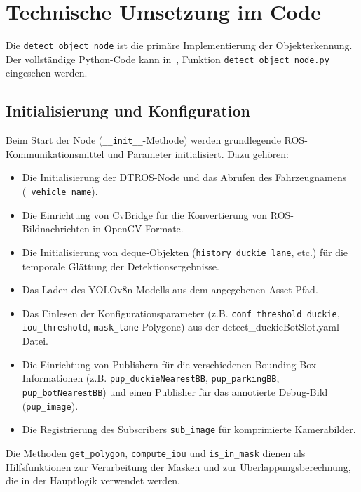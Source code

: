 \section{Technische Umsetzung im Code}
\label{sec:object_detection_code}

Die \texttt{detect\_object\_node} ist die primäre Implementierung der Objekterkennung. Der vollständige Python-Code kann in~\cite{QuackSquad}, Funktion \texttt{detect\_object\_node.py} eingesehen werden.

\subsection{Initialisierung und Konfiguration}
Beim Start der Node (\texttt{\_\_init\_\_}-Methode) werden grundlegende \ac{ROS}-Kommunikationsmittel und Parameter initialisiert. Dazu gehören:
\begin{itemize}
    \item Die Initialisierung der DTROS-Node und das Abrufen des Fahrzeugnamens (\texttt{\_vehicle\_name}).
    \item Die Einrichtung von CvBridge für die Konvertierung von \ac{ROS}-Bildnachrichten in OpenCV-Formate.
    \item Die Initialisierung von deque-Objekten (\texttt{history\_duckie\_lane}, etc.) für die temporale Glättung der Detektionsergebnisse.
    \item Das Laden des YOLOv8n-Modells aus dem angegebenen Asset-Pfad.
    \item Das Einlesen der Konfigurationsparameter (z.B. \texttt{conf\_threshold\_duckie}, \texttt{iou\_threshold}, \texttt{mask\_lane} Polygone) aus der detect\_duckieBotSlot.yaml-Datei.
    \item Die Einrichtung von Publishern für die verschiedenen Bounding Box-Informationen (z.B. \texttt{pup\_duckieNearestBB}, \texttt{pup\_parkingBB}, \texttt{pup\_botNearestBB}) und einen Publisher für das annotierte Debug-Bild (\texttt{pup\_image}).
    \item Die Registrierung des Subscribers \texttt{sub\_image} für komprimierte Kamerabilder.
\end{itemize}
Die Methoden \texttt{get\_polygon}, \texttt{compute\_iou} und \texttt{is\_in\_mask} dienen als Hilfsfunktionen zur Verarbeitung der Masken und zur Überlappungsberechnung, die in der Hauptlogik verwendet werden.


